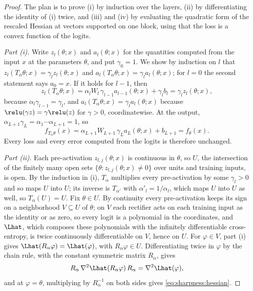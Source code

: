 \begin{refsection}
\begin{proof}
The plan is to prove (i) by induction over the layers, (ii) by differentiating the identity of (i) twice, and (iii) and (iv) by evaluating the quadratic form of the rescaled Hessian at vectors supported on one block, using that the loss is a convex function of the logits.

\emph{Part (i).} Write $z_l(\theta;x)$ and $a_l(\theta;x)$ for the quantities computed from the input $x$ at the parameters $\theta$, and put $\gamma_0=1$. We show by induction on $l$ that $z_l(T_\alpha\theta;x)=\gamma_lz_l(\theta;x)$ and $a_l(T_\alpha\theta;x)=\gamma_la_l(\theta;x)$; for $l=0$ the second statement says $a_0=x$. If it holds for $l-1$, then
\[
z_l(T_\alpha\theta;x)=\alpha_lW_l\,\gamma_{l-1}a_{l-1}(\theta;x)+\gamma_lb_l=\gamma_lz_l(\theta;x),
\]
because $\alpha_l\gamma_{l-1}=\gamma_l$, and $a_l(T_\alpha\theta;x)=\gamma_la_l(\theta;x)$ because $\relu(\gamma z)=\gamma\relu(z)$ for $\gamma>0$, coordinatewise. At the output, $\alpha_{L+1}\gamma_L=\alpha_1\cdots\alpha_{L+1}=1$, so
\[
f_{T_\alpha\theta}(x)=\alpha_{L+1}W_{L+1}\,\gamma_La_L(\theta;x)+b_{L+1}=f_\theta(x).
\]
Every loss and every error computed from the logits is therefore unchanged.

\emph{Part (ii).} Each pre-activation $z_{l,j}(\theta;x)$ is continuous in $\theta$, so $U$, the intersection of the finitely many open sets $\{\theta:z_{l,j}(\theta;x)\ne0\}$ over units and training inputs, is open. By the induction in (i), $T_\alpha$ multiplies every pre-activation by some $\gamma_l>0$ and so maps $U$ into $U$; its inverse is $T_{\alpha'}$ with $\alpha'_l=1/\alpha_l$, which maps $U$ into $U$ as well, so $T_\alpha(U)=U$. Fix $\theta\in U$. By continuity every pre-activation keeps its sign on a neighborhood $V\subseteq U$ of $\theta$; on $V$ each rectifier acts on each training input as the identity or as zero, so every logit is a polynomial in the coordinates, and $\Lhat$, which composes these polynomials with the infinitely differentiable cross-entropy, is twice continuously differentiable on $V$, hence on $U$. For $\varphi\in V$, part (i) gives $\Lhat(R_\alpha\varphi)=\Lhat(\varphi)$, with $R_\alpha\varphi\in U$. Differentiating twice in $\varphi$ by the chain rule, with the constant symmetric matrix $R_\alpha$, gives
\[
R_\alpha\,\nabla^2\Lhat(R_\alpha\varphi)\,R_\alpha=\nabla^2\Lhat(\varphi),
\]
and at $\varphi=\theta$, multiplying by $R_\alpha^{-1}$ on both sides gives \eqref{eq:sharpness:hessian}.


\end{proof}
\end{refsection}
